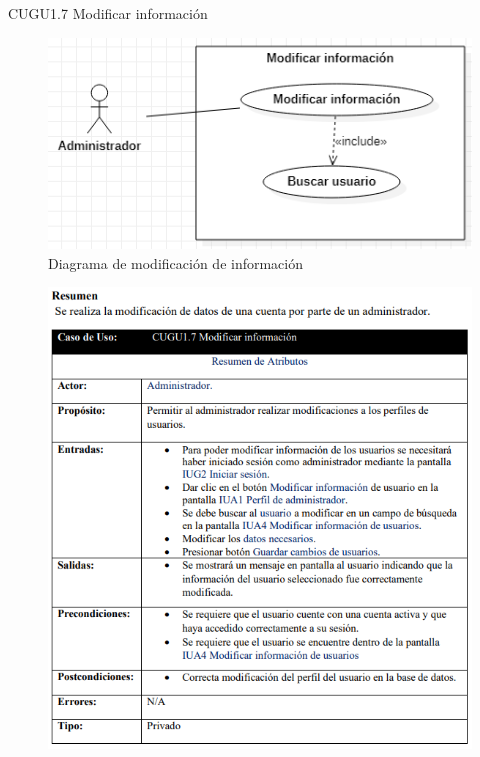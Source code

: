 \documentclass[12pt,letterpaper]{article}
\begin{document}
            \newpage
            CUGU1.7 Modificar información 
            \begin{figure}[H]
                \centering
                \includegraphics [scale=0.5]{casosUso/modificarInformacion}
                \caption{Diagrama de modificación de información}
            \end{figure}
            \begin{figure}[H]
                \centering
                \includegraphics [scale=0.75]{specs/specModificarInformacion}
            \end{figure}
\end{document}
